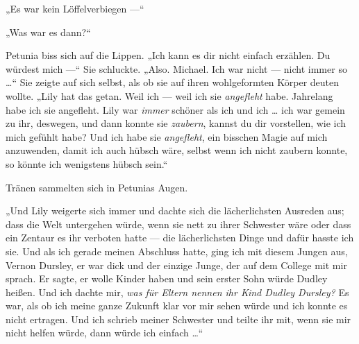 „Es war kein Löffelverbiegen —“

„Was war es dann?“

Petunia biss sich auf die Lippen.
„Ich kann es dir nicht einfach erzählen. Du würdest mich —“ Sie schluckte.
„Also. Michael. Ich war nicht — nicht immer so …“ Sie zeigte auf sich selbst, als ob sie auf ihren wohlgeformten Körper deuten wollte.
„Lily hat das getan. Weil ich — weil ich sie \emph{angefleht} habe. Jahrelang habe ich sie angefleht. Lily war \emph{immer} schöner als ich und ich … ich war gemein zu ihr, deswegen, und dann konnte sie \emph{zaubern}, kannst du dir vorstellen, wie ich mich gefühlt habe? Und ich habe sie \emph{angefleht}, ein bisschen Magie auf mich anzuwenden, damit ich auch hübsch wäre, selbst wenn ich nicht zaubern konnte, so könnte ich wenigstens hübsch sein.“

Tränen sammelten sich in Petunias Augen.

„Und Lily weigerte sich immer und dachte sich die lächerlichsten Ausreden aus; dass die Welt untergehen würde, wenn sie nett zu ihrer Schwester wäre oder dass ein Zentaur es ihr verboten hatte — die lächerlichsten Dinge und dafür hasste ich sie. Und als ich gerade meinen Abschluss hatte, ging ich mit diesem Jungen aus, Vernon Dursley, er war dick und der einzige Junge, der auf dem College mit mir sprach. Er sagte, er wolle Kinder haben und sein erster Sohn würde Dudley heißen. Und ich dachte mir, \emph{was für Eltern nennen ihr Kind Dudley Dursley?} Es war, als ob ich meine ganze Zukunft klar vor mir sehen würde und ich konnte es nicht ertragen. Und ich schrieb meiner Schwester und teilte ihr mit, wenn sie mir nicht helfen würde, dann würde ich einfach …“

